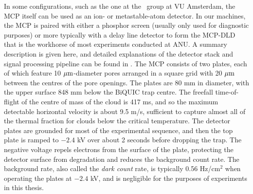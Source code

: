 	In some configurations, such as the one at the \mhe~group at VU Amsterdam, the MCP itself can be used as an ion- or metastable-atom detector.
	In our machines, the MCP is paired with either a phosphor screen (usually only used for diagnostic purposes) or more typically with a delay line detector to form the MCP-DLD that is the workhorse of most experiments conducted at ANU.
	A summary description is given here, and detailed explanations of the detector stack and signal processing pipeline can be found in \cite{ShinThesis, HodgmanThesis, ManningThesis}.
	The MCP consists of two plates, each of which feature 10 $\mu\textrm{m}$-diameter pores arranged in a square grid with 20 $\mu\textrm{m}$ between the centres of the pore openings.
	The plates are 80 mm in diameter, with the upper surface 848 mm below the BiQUIC trap centre.
	The freefall time-of-flight of the centre of mass of the cloud is 417 ms, and so the maximum detectable horizontal velocity is about 9.5 m/s, sufficient to capture almost all of the thermal fraction for clouds below the critical temperature.
	The detector plates are grounded for most of the experimental sequence, and then the top plate is ramped to $-2.4$ kV over about 2 seconds before dropping the trap.
	The negative voltage repels electrons from the surface of the plate, protecting the detector surface from degradation and reduces the background count rate.
	The background rate, also called the \emph{dark count} rate, is typically 0.56 Hz/cm$^2$ when operating the plates at $-2.4$ kV, and is negligible for the purposes of experiments in this thesis.
	


